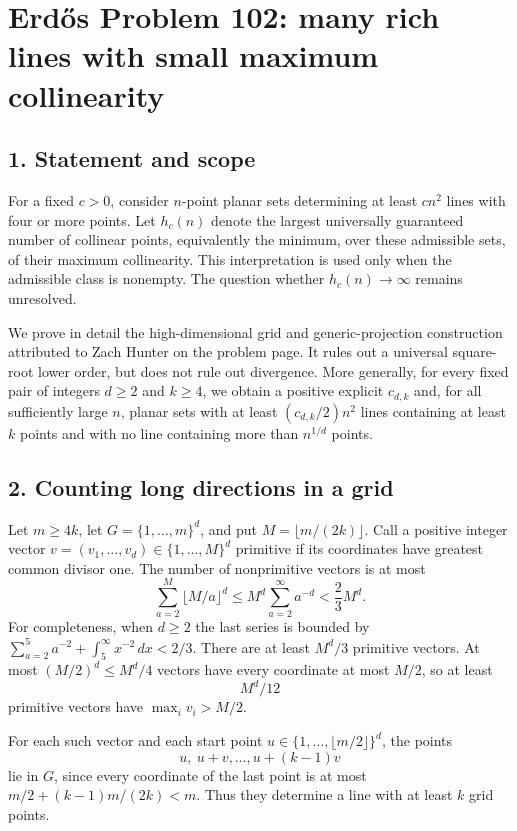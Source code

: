 \section*{Erd\H{o}s Problem 102: many rich lines with small maximum collinearity}

\subsection*{1. Statement and scope}
For a fixed $c>0$, consider $n$-point planar sets determining at least $cn^2$ lines with four or more points. Let $h_c(n)$ denote the largest universally guaranteed number of collinear points, equivalently the minimum, over these admissible sets, of their maximum collinearity. This interpretation is used only when the admissible class is nonempty. The question whether $h_c(n)\to\infty$ remains unresolved.

We prove in detail the high-dimensional grid and generic-projection construction attributed to Zach Hunter on the problem page. It rules out a universal square-root lower order, but does not rule out divergence. More generally, for every fixed pair of integers $d\ge2$ and $k\ge4$, we obtain a positive explicit $c_{d,k}$ and, for all sufficiently large $n$, planar sets with at least $(c_{d,k}/2)n^2$ lines containing at least $k$ points and with no line containing more than $n^{1/d}$ points.

\subsection*{2. Counting long directions in a grid}
Let $m\ge4k$, let $G=\{1,\ldots,m\}^d$, and put $M=\lfloor m/(2k)\rfloor$. Call a positive integer vector $v=(v_1,\ldots,v_d)\in\{1,\ldots,M\}^d$ primitive if its coordinates have greatest common divisor one. The number of nonprimitive vectors is at most
\[
 \sum_{a=2}^M\lfloor M/a\rfloor^d
 \le M^d\sum_{a=2}^{\infty}a^{-d}<\frac23 M^d.\tag{1}
\]
For completeness, when $d\ge2$ the last series is bounded by
$\sum_{a=2}^5a^{-2}+\int_5^\infty x^{-2}\,dx<2/3$.
There are at least $M^d/3$ primitive vectors. At most $(M/2)^d\le M^d/4$ vectors have every coordinate at most $M/2$, so at least
\[
 M^d/12\tag{2}
\]
primitive vectors have $\max_i v_i>M/2$.

For each such vector and each start point $u\in\{1,\ldots,\lfloor m/2\rfloor\}^d$, the points
\[
 u,\ u+v,\ldots,u+(k-1)v
\]
lie in $G$, since every coordinate of the last point is at most $m/2+(k-1)m/(2k)<m$. Thus they determine a line with at least $k$ grid points.

